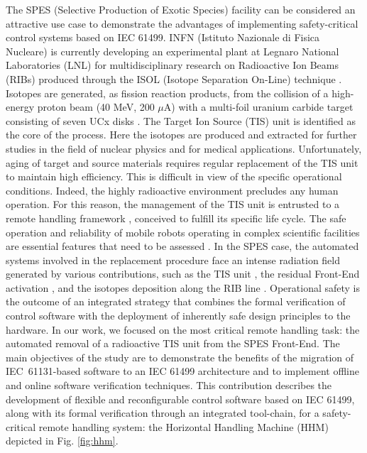 \begin{bibunit}
\noindent The SPES (Selective Production of Exotic Species) facility \cite{Marchietal.2020} can be considered an attractive use case to demonstrate the advantages of implementing safety-critical control systems based on IEC 61499. INFN (Istituto Nazionale di Fisica Nucleare) is currently developing an experimental plant at Legnaro National Laboratories (LNL) for multidisciplinary research on Radioactive Ion Beams (RIBs) produced through the ISOL (Isotope Separation On-Line) technique \cite{Andrighetto2018}. Isotopes are generated, as fission reaction products, from the collision of a high-energy proton beam (40 MeV, 200 $\mu$A) with a multi-foil uranium carbide target \cite{Andrighetto2019} consisting of seven UCx disks \cite{Corradetti2021}. The Target Ion Source (TIS) unit \cite{Monetti2015} is identified as the core of the process. Here the isotopes are produced and extracted for further studies in the field of nuclear physics and for medical applications. Unfortunately, aging of target and source materials requires regular replacement of the TIS unit to maintain high efficiency. This is difficult in view of the specific operational conditions. Indeed, the highly radioactive environment precludes any human operation.
For this reason, the management of the TIS unit is entrusted to a remote handling framework \cite{lilli2023}, conceived to fulfill its specific life cycle. The safe operation and reliability of mobile robots operating in complex scientific facilities are essential features that need to be assessed \cite{khan2014}. In the SPES case, the automated systems involved in the replacement procedure face an intense radiation field generated by various contributions, such as the TIS unit \cite{Monetti2015}, the residual Front-End activation \cite{Donzella2020}, and the isotopes deposition along the RIB line \cite{Centofante2021Study}. 
Operational safety is the outcome of an integrated strategy that combines the formal verification of control software with the deployment of inherently safe design principles to the hardware.
In our work, we focused on the most critical remote handling task: the automated removal of a radioactive TIS unit from the SPES Front-End.
The main objectives of the study are to demonstrate the benefits of the migration of \mbox{IEC 61131-based} software to an IEC 61499 architecture and to implement offline and online software verification techniques. This contribution describes the development of flexible and reconfigurable control software based on IEC 61499, along with its formal verification through an integrated tool-chain, for a safety-critical remote handling system: the Horizontal Handling Machine (HHM) depicted in Fig. \ref{fig:hhm}. 

\end{bibunit}
